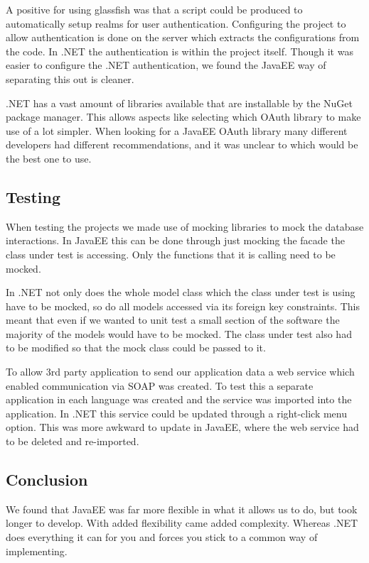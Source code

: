 A positive for using glassfish was that a script could be produced to automatically setup realms for user authentication. Configuring the project to allow authentication is done on the server which extracts the configurations from the code. In .NET the authentication is within the project itself. Though it was easier to configure the .NET authentication, we found the JavaEE way of separating this out is cleaner.


.NET has a vast amount of libraries available that are installable by the NuGet package manager. This allows aspects like selecting which OAuth library to make use of a lot simpler. When looking for a JavaEE OAuth library many different developers had different recommendations, and it was unclear to which would be the best one to use. 


\subsection{Testing}
When testing the projects we made use of mocking libraries to mock the database interactions. In JavaEE this can be done through just mocking the facade the class under test is accessing. Only the functions that it is calling need to be mocked. 

In .NET not only does the whole model class which the class under test is using have to be mocked, so do all models accessed via its foreign key constraints. This meant that even if we wanted to unit test a small section of the software the majority of the models would have to be mocked. The class under test also had to be modified so that the mock class could be passed to it.

To allow 3rd party application to send our application data a web service which enabled communication via SOAP was created. To test this a separate application in each language was created and the service was imported into the application. In .NET this service could be updated through a right-click menu option. This was more awkward to update in JavaEE, where the web service had to be deleted and re-imported.

\subsection{Conclusion}

We found that JavaEE was far more flexible in what it allows us to do, but took longer to develop. With added flexibility came added complexity. Whereas .NET does everything it can for you and forces you stick to a common way of implementing. 


